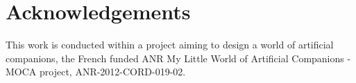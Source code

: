 \documentclass[a4paper,twocolumn]{svjour3}
\begin{document}
%		
%		
	




\section{Acknowledgements}
This work is conducted within a project aiming to design a world of artificial companions, the French funded ANR My Little World of Artificial Companions - MOCA project, ANR-2012-CORD-019-02.

\small


\end{document}
